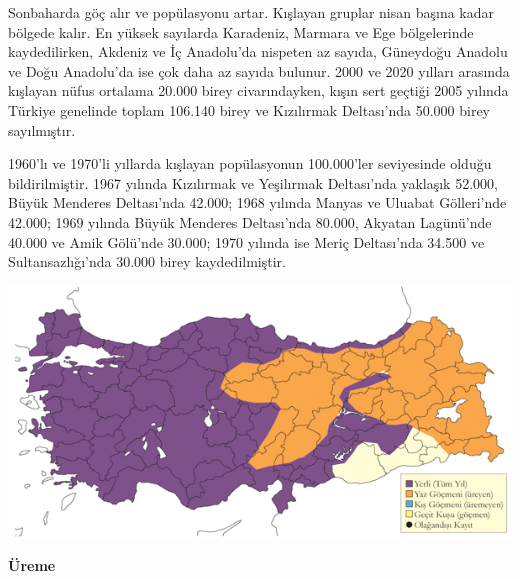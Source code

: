 \documentclass[
  letterpaper,
  DIV=11,
  numbers=noendperiod]{scrreprt}
\begin{document}
Sonbaharda göç alır ve popülasyonu artar. Kışlayan gruplar nisan başına
kadar bölgede kalır. En yüksek sayılarda Karadeniz, Marmara ve Ege
bölgelerinde kaydedilirken, Akdeniz ve İç Anadolu'da nispeten az sayıda,
Güneydoğu Anadolu ve Doğu Anadolu'da ise çok daha az sayıda bulunur.
2000 ve 2020 yılları arasında kışlayan nüfus ortalama 20.000 birey
civarındayken, kışın sert geçtiği 2005 yılında Türkiye genelinde toplam
106.140 birey ve Kızılırmak Deltası'nda 50.000 birey sayılmıştır.

1960'lı ve 1970'li yıllarda kışlayan popülasyonun 100.000'ler
seviyesinde olduğu bildirilmiştir. 1967 yılında Kızılırmak ve Yeşilırmak
Deltası'nda yaklaşık 52.000, Büyük Menderes Deltası'nda 42.000; 1968
yılında Manyas ve Uluabat Gölleri'nde 42.000; 1969 yılında Büyük
Menderes Deltası'nda 80.000, Akyatan Lagünü'nde 40.000 ve Amik Gölü'nde
30.000; 1970 yılında ise Meriç Deltası'nda 34.500 ve Sultansazlığı'nda
30.000 birey kaydedilmiştir.

\includegraphics{images/harita_Page_016.png}

\textbf{Üreme}
\end{document}
